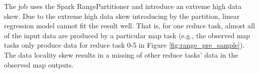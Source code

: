 {The job uses the Spark RangePartitioner and introduce an extreme high data skew.
Due to the extreme high data skew introducing by the partition, linear regression model cannot fit the result well.
That is, for one reduce task, almost all of the input data are produced by a particular map task (e.g., the observed map tasks only produce data for reduce task 0-5 in Figure \ref{fig:range_pre_sample}).
The data locality skew results in a missing of other reduce tasks' data in the observed map outputs.

}

